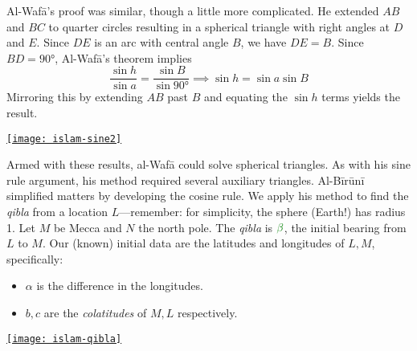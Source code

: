 \begin{minipage}[t]{0.65\linewidth}\vspace{0pt}
	Al-Wafā's proof was similar, though a little more complicated. He extended $AB$ and $BC$ to quarter circles resulting in a spherical triangle with right angles at $D$ and $E$. Since $DE$ is an arc with central angle $B$, we have $DE=B$. Since $BD=\ang{90}$, Al-Wafā's theorem implies
	\[
		\frac{\sin h}{\sin a}=\frac{\sin B}{\sin \ang{90}}\implies \sin h=\sin a\sin B
	\]
	Mirroring this by extending $AB$ past $B$ and equating the $\sin h$ terms yields the result.
\end{minipage}
\hfill
\begin{minipage}[t]{0.34\linewidth}\vspace{-15pt}
	\flushright
	\href{http://math.uci.edu/~ndonalds/math184/islam-sine2.html}{\texttt{[image: islam-sine2]}}
\end{minipage}
\smallbreak

\begin{minipage}[t]{0.65\linewidth}\vspace{0pt}
	Armed with these results, al-Wafā could solve spherical triangles. As with his sine rule argument, his method required several auxiliary triangles.\smallbreak
	Al-Bīrūnī simplified matters by developing the cosine rule. We apply his method to find the \emph{qibla} from a location $L$---remember: for simplicity, the sphere (Earth!) has radius 1.\smallbreak
	Let $M$ be Mecca and $N$ the north pole. The \emph{qibla} is $\textcolor{Green}{\beta}$, the initial bearing from $L$ to $M$. Our (known) initial data are the latitudes and longitudes of $L,M$, specifically:
	\begin{itemize}\itemsep0pt
	  \item $\alpha$ is the difference in the longitudes.
	  \item $b,c$ are the \emph{colatitudes}\footnotemark{} of $M,L$ respectively. 
	\end{itemize} 
\end{minipage}
\hfill
\begin{minipage}[t]{0.34\linewidth}\vspace{0pt}
	\flushright
	\href{http://math.uci.edu/~ndonalds/math184/islam-qibla.html}{\texttt{[image: islam-qibla]}}
\end{minipage}
\medbreak


